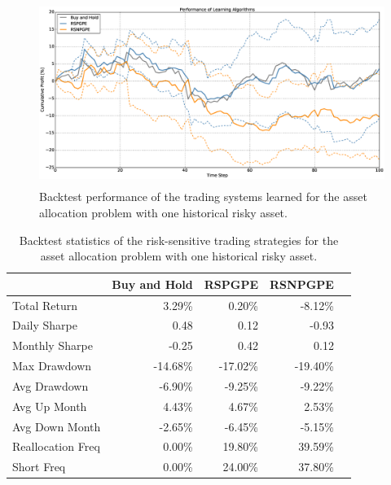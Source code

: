 \begin{figure}[t!]
	\centering
	\includegraphics[height=6cm,width=1.0\textwidth]{Images/8_11_single_hist_sensitive_performance}
	\caption[Backtest performance with one historical risky asset]{Backtest performance of the trading systems learned for the asset allocation problem with one historical risky asset.}
	\label{fig:8_11_single_hist_sensitive_performance}
\end{figure}

\begin{table}[t!]
\centering
\begin{tabular}{@{}lrrrr@{}}
\toprule
                  & Buy and Hold & RSPGPE   & RSNPGPE  \\ \midrule
Total Return      & 3.29\%       & 0.20\%   & -8.12\%  \\
Daily Sharpe      & 0.48         & 0.12     & -0.93    \\
Monthly Sharpe    & -0.25        & 0.42     & 0.12     \\
Max Drawdown      & -14.68\%     & -17.02\% & -19.40\% \\
Avg Drawdown      & -6.90\%      & -9.25\%  & -9.22\%  \\
Avg Up Month      & 4.43\%       & 4.67\%   & 2.53\%   \\
Avg Down Month    & -2.65\%      & -6.45\%  & -5.15\%  \\
Reallocation Freq & 0.00\%       & 19.80\%  & 39.59\%  \\
Short Freq        & 0.00\%       & 24.00\%  & 37.80\%  \\ \bottomrule
\end{tabular}
\caption[Backtest statistics for risk-sensitive learning with one historical risky asset]{Backtest statistics of the risk-sensitive trading strategies for the asset allocation problem with one historical risky asset.}
\label{tab:single_historical_sensitive_performance}
\end{table}
\clearpage





